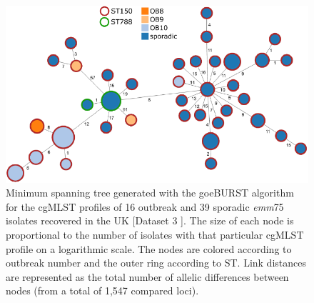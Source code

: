 \newpage
\begin{figure}[h!]
    \centering
    \includegraphics[angle=0,width=\textwidth]{figures/chapter 4/FigureS12.pdf}
    \caption[Minimum spanning tree generated with the goeBURST algorithm for the cgMLST profiles of 16 outbreak and 39 sporadic \textit{emm}75 isolates recovered in the UK.]{Minimum spanning tree generated with the goeBURST algorithm for the \ac{cgMLST} profiles of 16 outbreak and 39 sporadic \textit{emm}75 isolates recovered in the UK \cite{coelho_genomic_2019} [Dataset 3 \cite{friaes_supplemental_2023}]. The size of each node is proportional to the number of isolates with that particular \ac{cgMLST} profile on a logarithmic scale. The nodes are colored according to outbreak number and the outer ring according to \ac{ST}. Link distances are represented as the total number of allelic differences between nodes (from a total of 1,547 compared loci).}
    \label{fig:chap4_figureS12}
\end{figure}


